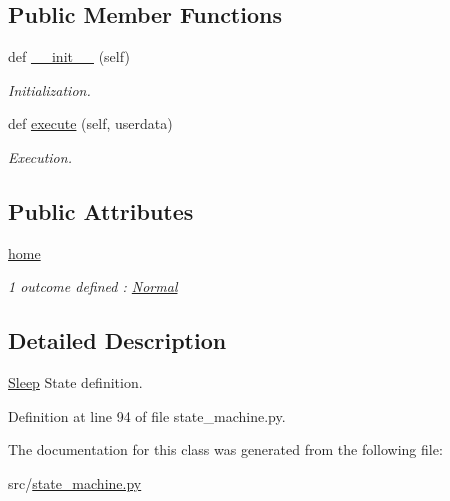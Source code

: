 \subsection*{Public Member Functions}
\begin{DoxyCompactItemize}
\item 
\mbox{\label{classstate__machine_1_1Sleep_a473b93a1ddf11f9e664d1fb694ce1a3c}} 
def \hyperlink{classstate__machine_1_1Sleep_a473b93a1ddf11f9e664d1fb694ce1a3c}{\+\_\+\+\_\+init\+\_\+\+\_\+} (self)
\begin{DoxyCompactList}\small\item\em Initialization. \end{DoxyCompactList}\item 
\mbox{\label{classstate__machine_1_1Sleep_a89527836f1edcefb6467fa9c041fbbfe}} 
def \hyperlink{classstate__machine_1_1Sleep_a89527836f1edcefb6467fa9c041fbbfe}{execute} (self, userdata)
\begin{DoxyCompactList}\small\item\em Execution. \end{DoxyCompactList}\end{DoxyCompactItemize}
\subsection*{Public Attributes}
\begin{DoxyCompactItemize}
\item 
\mbox{\label{classstate__machine_1_1Sleep_a6bd959627ed45867516c94e3eafc05bb}} 
\hyperlink{classstate__machine_1_1Sleep_a6bd959627ed45867516c94e3eafc05bb}{home}
\begin{DoxyCompactList}\small\item\em 1 outcome defined \+: \hyperlink{classstate__machine_1_1Normal}{Normal} \end{DoxyCompactList}\end{DoxyCompactItemize}


\subsection{Detailed Description}
\hyperlink{classstate__machine_1_1Sleep}{Sleep} State definition. 

Definition at line 94 of file state\+\_\+machine.\+py.



The documentation for this class was generated from the following file\+:\begin{DoxyCompactItemize}
\item 
src/\hyperlink{state__machine_8py}{state\+\_\+machine.\+py}\end{DoxyCompactItemize}
